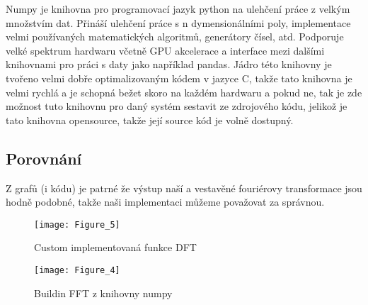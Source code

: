 Numpy je knihovna pro programovací jazyk python na ulehčení práce z velkým množstvím dat. Přináší ulehčení práce s n dymensionálními poly, implementace velmi používaných matematických algoritmů, generátory čísel, atd.
Podporuje velké spektrum hardwaru včetně GPU akcelerace a interface mezi dalšími knihovnami pro práci s daty jako například pandas.
Jádro této knihovny je tvořeno velmi dobře optimalizovaným kódem v jazyce C, takže tato knihovna je velmi rychlá a je schopná bežet skoro na každém hardwaru a pokud ne, tak je zde možnost tuto knihovnu pro daný systém sestavit ze zdrojového kódu, jelikož je tato knihovna opensource, takže její source kód je volně dostupný.

\subsection{Porovnání}
Z grafů (i kódu) je patrné že výstup naší a vestavěné fouriérovy transformace jsou hodně podobné, takže naši implementaci můžeme považovat za správnou.

\begin{landscape}
\begin{figure}[H]
	\centering
	\texttt{[image: Figure\_5]}
	\caption{Custom implementovaná funkce DFT}
\end{figure}
\end{landscape}

\begin{landscape}
\begin{figure}[H] 
	\centering
	\texttt{[image: Figure\_4]}
	\caption{Buildin FFT z knihovny numpy}
\end{figure}
\end{landscape}